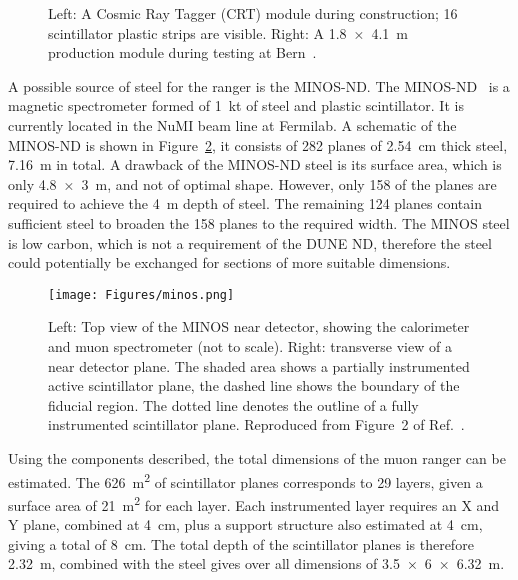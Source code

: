 \documentclass[a4paper]{article}
\begin{document}
\begin{figure}[H]
	\caption{Left: A Cosmic Ray Tagger (CRT) module during construction; 16 scintillator plastic strips are visible. Right: A \SI[product-units=repeat]{1.8x4.1}{\metre} production module during testing at Bern~\cite{CRT}.}
	\label{fig:CRT}
\end{figure}

A possible source of steel for the ranger is the MINOS-ND. 
The MINOS-ND~\cite{MINOS_NIM} is a magnetic spectrometer formed of \SI{1}{\kilo\tonne} of steel and plastic scintillator.
It is currently located in the NuMI beam line at Fermilab.  
A schematic of the MINOS-ND is shown in Figure~\ref{fig:minos}, it consists of 282 planes of \SI{2.54}{\centi\metre} thick steel,  \SI{7.16}{\metre} in total. 
A drawback of the MINOS-ND steel is its surface area, which is only \SI[product-units=repeat]{4.8x3}{\metre}, and not of optimal shape.
However, only 158 of the planes are required to achieve the \SI{4}{\metre} depth of steel. 
The remaining 124 planes contain sufficient steel to broaden the 158 planes to the required width. 
The MINOS steel is low carbon, which is not a requirement of the DUNE ND, therefore the steel could potentially be exchanged for sections of more suitable dimensions.

\begin{figure}[H]
	\centering
	\texttt{[image: Figures/minos.png]}
	\caption{Left: Top view of the MINOS near detector, showing the calorimeter and muon spectrometer (not to scale). Right: transverse view of a near detector plane. The shaded area shows a partially instrumented active scintillator plane, the dashed line shows the boundary of the fiducial region. The dotted line denotes the outline of a fully instrumented scintillator plane. Reproduced from Figure~2 of Ref.~\cite{MINOSDetectors}.}
	\label{fig:minos}
\end{figure}

Using the components described, the total dimensions of the muon ranger can be estimated.  
The \SI{626}{\metre\squared} of scintillator planes corresponds to 29 layers, given a surface area of \SI{21}{\metre\squared} for each layer.  
Each instrumented layer requires an X and Y plane, combined at \SI{4}{\centi\metre}, plus a support structure also estimated at \SI{4}{\centi\metre}, giving a total of \SI{8}{\centi\metre}. 
The total depth of the scintillator planes is therefore \SI{2.32}{\metre}, combined with the steel gives over all dimensions of \SI[product-units=repeat]{3.5x6x6.32}{\metre}.        
\end{document}
